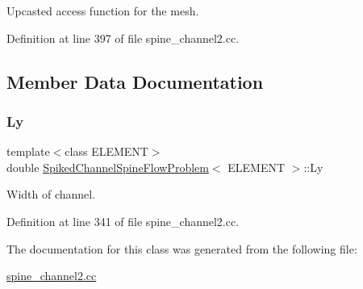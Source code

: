 Upcasted access function for the mesh. 



Definition at line 397 of file spine\+\_\+channel2.\+cc.



\subsection{Member Data Documentation}
\mbox{\label{classSpikedChannelSpineFlowProblem_abb8d6a5648396f351835d646c2731b12}} 
\subsubsection{\texorpdfstring{Ly}{Ly}}
{\footnotesize\ttfamily template$<$class E\+L\+E\+M\+E\+NT$>$ \\
double \hyperlink{classSpikedChannelSpineFlowProblem}{Spiked\+Channel\+Spine\+Flow\+Problem}$<$ E\+L\+E\+M\+E\+NT $>$\+::Ly\hspace{0.3cm}{\ttfamily [private]}}



Width of channel. 



Definition at line 341 of file spine\+\_\+channel2.\+cc.



The documentation for this class was generated from the following file\+:\begin{DoxyCompactItemize}
\item 
\hyperlink{spine__channel2_8cc}{spine\+\_\+channel2.\+cc}\end{DoxyCompactItemize}
